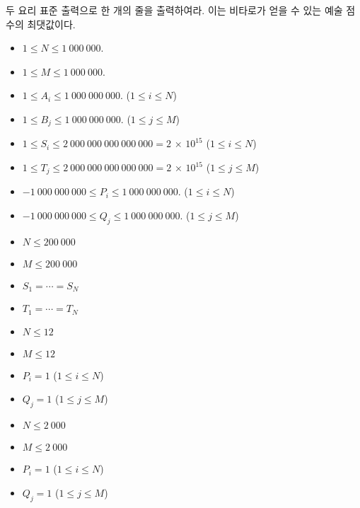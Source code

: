 \begin{problem}{두 요리}
	표준 출력으로 한 개의 줄을 출력하여라. 이는 비타로가 얻을 수 있는 예술 점수의 최댓값이다.
		
	\Constraints
	
	\begin{itemize}
		\item $1 \le N \le 1\ 000\ 000$.
		\item $1 \le M \le 1\ 000\ 000$.
		\item $1 \le A_i \le 1\ 000\ 000\ 000$. ($1 \le i \le N$)
		\item $1 \le B_j \le 1\ 000\ 000\ 000$. ($1 \le j \le M$)
		\item $1 \le S_i \le 2\ 000\ 000\ 000\ 000\ 000 = 2$ × $10^{15}$ ($1 \le i \le N$)
		\item $1 \le T_j \le 2\ 000\ 000\ 000\ 000\ 000 = 2$ × $10^{15}$ ($1 \le j \le M$)
		\item $-1\ 000\ 000\ 000 \le P_i \le 1\ 000\ 000\ 000$. ($1 \le i \le N$)
		\item $-1\ 000\ 000\ 000 \le Q_j \le 1\ 000\ 000\ 000$. ($1 \le j \le M$)
	\end{itemize}
	
	
	\begin{itemize}
		\item $N \le 200\ 000$
		\item $M \le 200\ 000$
		\item $S_1 = \cdots = S_N$
		\item $T_1 = \cdots = T_N$
	\end{itemize}


	\begin{itemize}
		\item $N \le 12$
		\item $M \le 12$
		\item $P_i = 1$ ($1 \le i \le N$)
		\item $Q_j = 1$ ($1 \le j \le M$)
	\end{itemize}



	\begin{itemize}
		\item $N \le 2\ 000$
		\item $M \le 2\ 000$
		\item $P_i = 1$ ($1 \le i \le N$)
		\item $Q_j = 1$ ($1 \le j \le M$)
	\end{itemize}




\end{problem}

